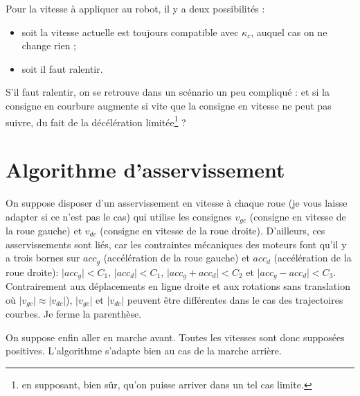 \documentclass[11pt]{article}
\begin{document}
    Pour la vitesse à appliquer au robot, il y a deux possibilités :
    \begin{itemize}
        \item soit la vitesse actuelle est toujours compatible avec $\kappa_c$, auquel cas on ne change rien ;
        \item soit il faut ralentir.
    \end{itemize}

    S'il faut ralentir, on se retrouve dans un scénario un peu compliqué : et si la consigne en courbure augmente si vite que la consigne en vitesse ne peut pas suivre, du fait de la décélération limitée\footnote{en supposant, bien sûr, qu'on puisse arriver dans un tel cas limite.} ?

    \section{Algorithme d'asservissement}\label{sec:algorithmeD'asservissement}

    On suppose disposer d'un asservissement en vitesse à chaque roue (je vous laisse adapter si ce n'est pas le cas) qui utilise les consignes $v_{gc}$ (consigne en vitesse de la roue gauche) et $v_{dc}$ (consigne en vitesse de la roue droite). D'ailleurs, ces asservissements sont liés, car les contraintes mécaniques des moteurs font qu'il y a trois bornes sur $acc_g$ (accélération de la roue gauche) et $acc_d$ (accélération de la roue droite): $\vert acc_g \vert < C_1$, $\vert acc_d \vert < C_1$, $\vert acc_g + acc_d \vert < C_2$ et $\vert acc_g - acc_d \vert < C_3$. Contrairement aux déplacements en ligne droite et aux rotations sans translation où $\vert v_{gc} \vert \approx \vert v_{dc} \vert$), $\vert v_{gc} \vert$ et $\vert v_{dc} \vert$ peuvent être différentes dans le cas des trajectoires courbes.
    Je ferme la parenthèse.

    On suppose enfin aller en marche avant.
    Toutes les vitesses sont donc supposées positives.
    L'algorithme s'adapte bien au cas de la marche arrière.
\end{document}
